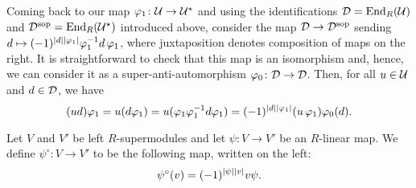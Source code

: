 \documentclass{amsbook}
\begin{document}



Coming back to our map $\varphi_1\colon \mathcal U \to \mathcal U^\star$ and using the identifications $\mathcal{D} = \operatorname{End}_R(\mathcal U)$ and $\mathcal{D}^{\mathrm{sop}} = \operatorname{End}_R(\mathcal U^\star)$ introduced above, consider the map $\mathcal{D} \to \mathcal{D}^{\mathrm{sop}}$ sending $d \mapsto (-1)^{|d||\varphi_1|}\varphi_1^{-1} d \,\varphi_1$, where juxtaposition denotes composition of maps on the right. 
It is straightforward to check that this map is an isomorphism and, hence, we can consider it as a super-anti-automorphism $\varphi_0 \colon \mathcal{D} \to \mathcal{D}$. 
Then, for all $u\in \mathcal U$ and $d\in \mathcal{D}$, we have
%
\begin{equation}\label{eq:sesquilinear-before-B}
    (ud)\varphi_1 = u (d\varphi_1) =  u(\varphi_1\varphi_1^{-1} d \varphi_1) = (-1)^{|d||\varphi_1|}(u\,\varphi_1 )\varphi_0(d).
\end{equation}


\begin{defi}\label{def:change-map-to-the-left}
    Let $V$ and $V'$ be left $R$-supermodules and let $\psi: V \to V'$ be an $R$-linear map. We define $\psi^\circ: V \to  V'$ to be the following map, written on the left:
    \[
        \psi^\circ(v) = (-1)^{|\psi||v|} v\psi.
    \]
\end{defi}
\end{document}
